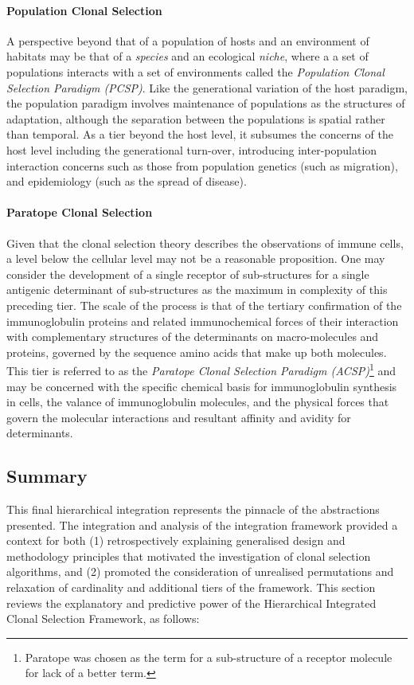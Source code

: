 %
%
\paragraph{Population Clonal Selection}
A perspective beyond that of a population of hosts and an environment of habitats may be that of a \emph{species} and an ecological \emph{niche}, where a a set of populations interacts with a set of environments called the \emph{Population Clonal Selection Paradigm (PCSP)}. Like the generational variation of the host paradigm, the population paradigm involves maintenance of populations as the structures of adaptation, although the separation between the populations is spatial rather than temporal. As a tier beyond the host level, it subsumes the concerns of the host level including the generational turn-over, introducing inter-population interaction concerns such as those from population genetics (such as migration), and epidemiology (such as the spread of disease).

%
%
\paragraph{Paratope Clonal Selection}
Given that the clonal selection theory describes the observations of immune cells, a level below the cellular level may not be a reasonable proposition. One may consider the development of a single receptor of sub-structures for a single antigenic determinant of sub-structures as the maximum in complexity of this preceding tier. The scale of the process is that of the tertiary confirmation of the immunoglobulin proteins and related immunochemical forces of their interaction with complementary structures of the determinants on macro-molecules and proteins, governed by the sequence amino acids that make up both molecules. This tier is referred to as the \emph{Paratope Clonal Selection Paradigm (ACSP)}\footnote{Paratope was chosen as the term for a sub-structure of a receptor molecule for lack of a better term.} and may be concerned with the specific chemical basis for immunoglobulin synthesis in cells, the valance of immunoglobulin molecules, and the physical forces that govern the molecular interactions and resultant affinity and avidity for determinants.

%
%
\subsection{Summary}
\label{sec:framework:ihcsf:summary}
This final hierarchical integration represents the pinnacle of the abstractions presented. The integration and analysis of the integration framework provided a context for both (1) retrospectively explaining generalised design and methodology principles that motivated the investigation of clonal selection algorithms, and (2) promoted the consideration of unrealised permutations and relaxation of cardinality and additional tiers of the framework. This section reviews the explanatory and predictive power of the Hierarchical Integrated Clonal Selection Framework, as follows:

